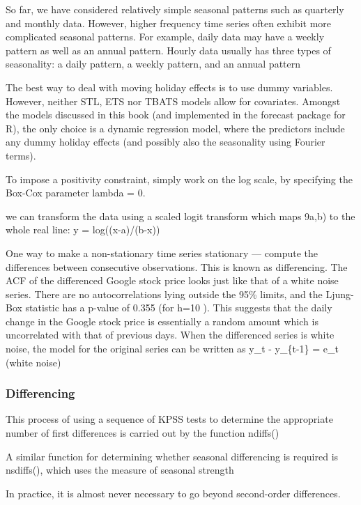 \documentclass[]{book}
\begin{document}
So far, we have considered relatively simple seasonal patterns such as quarterly and monthly data. However, higher frequency time series often exhibit more complicated seasonal patterns. For example, daily data may have a weekly pattern as well as an annual pattern. Hourly data usually has three types of seasonality: a daily pattern, a weekly pattern, and an annual pattern

The best way to deal with moving holiday effects is to use dummy variables. However, neither STL, ETS nor TBATS models allow for covariates. Amongst the models discussed in this book (and implemented in the forecast package for R), the only choice is a dynamic regression model, where the predictors include any dummy holiday effects (and possibly also the seasonality using Fourier terms).

To impose a positivity constraint, simply work on the log scale, by specifying the Box-Cox parameter lambda = 0.

we can transform the data using a scaled logit transform which maps 9a,b) to the whole real line: y = log((x-a)/(b-x))

One way to make a non-stationary time series stationary --- compute the differences between consecutive observations. This is known as differencing. The ACF of the differenced Google stock price looks just like that of a white noise series. There are no autocorrelations lying outside the 95\% limits, and the Ljung-Box statistic has a p-value of 0.355 (for h=10 ). This suggests that the daily change in the Google stock price is essentially a random amount which is uncorrelated with that of previous days. When the differenced series is white noise, the model for the original series can be written as y\_t - y\_\{t-1\} = e\_t (white noise)

\hypertarget{differencing}{%
\subsubsection{Differencing}\label{differencing}}

This process of using a sequence of KPSS tests to determine the appropriate number of first differences is carried out by the function ndiffs()

A similar function for determining whether seasonal differencing is required is nsdiffs(), which uses the measure of seasonal strength

In practice, it is almost never necessary to go beyond second-order differences.
\end{document}
